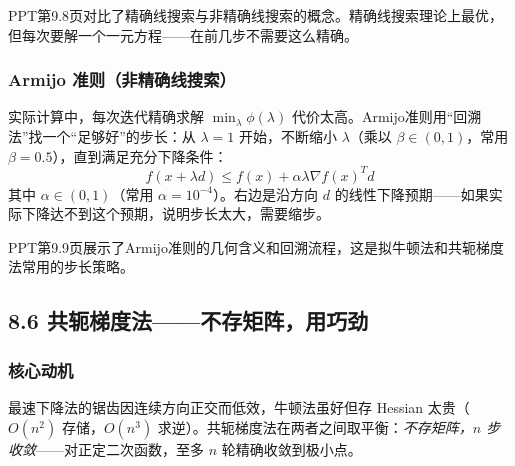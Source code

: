 PPT第9.8页对比了精确线搜索与非精确线搜索的概念。精确线搜索理论上最优，但每次要解一个一元方程——在前几步不需要这么精确。

\medskip
{}
\medskip

\subsubsection{Armijo 准则（非精确线搜索）}

实际计算中，每次迭代精确求解 $\min_\lambda \phi(\lambda)$ 代价太高。Armijo准则用``回溯法''找一个``足够好''的步长：从 $\lambda = 1$ 开始，不断缩小 $\lambda$（乘以 $\beta \in (0,1)$，常用 $\beta = 0.5$），直到满足充分下降条件：
\[
f(x + \lambda d) \le f(x) + \alpha \lambda \nabla f(x)^T d
\]
其中 $\alpha \in (0,1)$（常用 $\alpha = 10^{-4}$）。右边是沿方向 $d$ 的线性下降预期——如果实际下降达不到这个预期，说明步长太大，需要缩步。

PPT第9.9页展示了Armijo准则的几何含义和回溯流程，这是拟牛顿法和共轭梯度法常用的步长策略。

\medskip
{}
\medskip


\subsection{8.6 共轭梯度法——不存矩阵，用巧劲}

\subsubsection{核心动机}

最速下降法的锯齿因连续方向正交而低效，牛顿法虽好但存 Hessian 太贵（$O(n^2)$ 存储，$O(n^3)$ 求逆）。共轭梯度法在两者之间取平衡：\emph{不存矩阵，$n$ 步收敛}——对正定二次函数，至多 $n$ 轮精确收敛到极小点。

